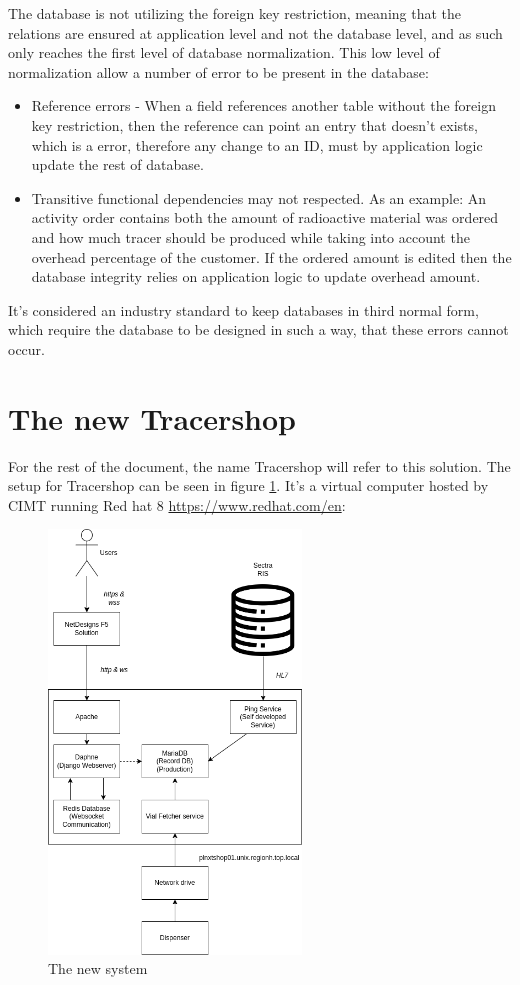 \documentclass{article}
\begin{document}
The database is not utilizing the foreign key restriction, meaning that the
relations are ensured at application level and not the database level, and as
 such only reaches the first level of database normalization.
This low level of normalization allow a number of error to be present in the
database:
\begin{itemize}
  \item Reference errors - When a field references another table without the
  foreign key restriction, then the reference can point an entry that doesn't
  exists, which is a error, therefore any change to an ID, must by application
  logic update the rest of database.
  \item Transitive functional dependencies may not respected. As an example:
  An activity order contains both the amount of radioactive material was ordered
  and how much tracer should be produced while taking into account the overhead
  percentage of the customer. If the ordered amount is edited then the database
  integrity relies on application logic to update overhead amount.
\end{itemize}
It's considered an industry standard to keep databases in third normal form,
which require the database to be designed in such a way, that these errors
cannot occur.

\section*{The new Tracershop}
For the rest of the document, the name Tracershop will refer to this solution.
The setup for Tracershop can be seen in figure \ref{fig:TSO}.
It's a virtual computer hosted by \gls{CIMT} running Red hat 8
\url{https://www.redhat.com/en}:

\begin{figure}[ht]
  \centering
  \includegraphics[width=0.6\textwidth]{figures/TracershopSystemOverview.png}
  \caption{The new system}
  \label{fig:TSO}
\end{figure}
\end{document}
